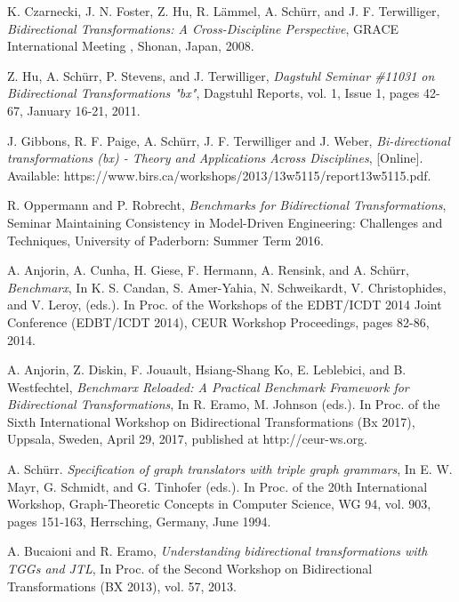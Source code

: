 \begin{thebibliography}{1}
	
	 K. Czarnecki, J. N. Foster, Z. Hu, R. L\"ammel, A. Sch\"urr, and J. F. Terwilliger,  {\em Bidirectional Transformations: A Cross-Discipline Perspective}, GRACE International Meeting , Shonan, Japan, 2008.
	
	 Z. Hu, A. Sch\"urr, P. Stevens, and J. Terwilliger, {\em Dagstuhl Seminar \#11031 on Bidirectional Transformations "bx"}, Dagstuhl Reports, vol. 1, Issue 1, pages 42-67, January 16-21, 2011.
	
	 J. Gibbons, R. F. Paige, A. Sch\"urr, J. F. Terwilliger and J. Weber, {\em Bi-directional transformations (bx) - Theory and Applications Across Disciplines}, [Online]. Available:  https://www.birs.ca/workshops/2013/13w5115/report13w5115.pdf.
	
	 R. Oppermann and P. Robrecht, {\em Benchmarks for Bidirectional Transformations}, Seminar Maintaining Consistency in Model-Driven Engineering: Challenges and Techniques, University of Paderborn: Summer Term 2016.
	
	 A. Anjorin, A. Cunha, H. Giese, F. Hermann, A. Rensink, and A. Sch\"urr, {\em Benchmarx}, In K. S. Candan, S. Amer-Yahia, N. Schweikardt, V. Christophides, and V. Leroy, (eds.). In Proc. of the Workshops of the EDBT/ICDT 2014 Joint Conference (EDBT/ICDT 2014), CEUR Workshop Proceedings, pages 82-86, 2014.
		
	 A. Anjorin, Z. Diskin, F. Jouault, Hsiang-Shang Ko, E. Leblebici, and B. Westfechtel, {\em Benchmarx Reloaded: A Practical Benchmark Framework for Bidirectional Transformations}, In R. Eramo, M. Johnson (eds.). In Proc. of the Sixth International Workshop on Bidirectional Transformations (Bx 2017),
	Uppsala, Sweden, April 29, 2017, published at http://ceur-ws.org.
	
	 A. Sch\"urr. {\em Specification of graph translators with triple graph grammars}, In E. W. Mayr, G. Schmidt, and G. Tinhofer (eds.). In Proc. of the 20th International Workshop, Graph-Theoretic Concepts in Computer Science, WG 94, vol. 903, pages 151-163, Herrsching, Germany, June 1994.
	
	 A. Bucaioni and R. Eramo, {\em Understanding bidirectional transformations with TGGs and JTL}, In Proc. of the Second Workshop on Bidirectional Transformations (BX 2013), vol. 57, 2013.
	

\end{thebibliography}
